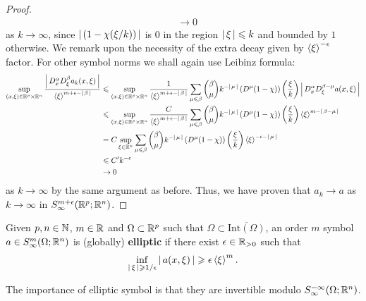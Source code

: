 \documentclass[12pt]{article}
\begin{document}
\begin{proof}
\begin{align*}
        & \to 0
    \end{align*}
    as $k \to \infty$, since $\abs{( 1- \chi(\xi/ k))}$ is 0 in the region $\abs{\xi} \leq k$ and bounded by $1$ otherwise.  We remark upon the necessity of the extra decay given by $\sym[\xi]^{-\epsilon}$ factor. For other symbol norms we shall again use Leibinz formula: 
    \begin{align*}
        \sup_{(x, \xi) \in \R^p \times \R^n} \frac{\abs{D^\alpha_x D^\beta_\xi a_k(x, \xi)}}{\sym[\xi]^{m + \epsilon - \abs{\beta}}} 
        & \leq \sup_{(x, \xi) \in \R^p \times \R^n} \frac{1}{\sym[\xi]^{m + \epsilon - \abs{\beta}}} \sum_{\mu \leq \beta} \binom{\beta}{\mu}k^{-\abs{\mu}} \brac{D^\mu (1 - \chi)}\brac{\frac{\xi}{k}} \abs{D^\alpha_x D^{\beta - \mu}_\xi a(x, \xi) } \\
        & \leq  \sup_{(x, \xi) \in \R^p \times \R^n} \frac{C}{\sym[\xi]^{m + \epsilon - \abs{\beta}}} \sum_{\mu \leq \beta} \binom{\beta}{\mu}k^{-\abs{\mu}} \brac{D^\mu (1 - \chi)}\brac{\frac{\xi}{k}} \sym[\xi]^{m - \abs{\beta - \mu}}  \\
        & = C \sup_{\xi \in \R^n} \sum_{\mu \leq \beta} \binom{\beta}{\mu}k^{-\abs{\mu}} \brac{D^\mu (1 - \chi)}\brac{\frac{\xi}{k}} \sym[\xi]^{- \epsilon - \abs{\mu}}  \\
        & \leq C' k^{- \epsilon} \\
        & \to 0
    \end{align*}
    as $k \to \infty$ by the same argument as before. Thus, we have proven that $a_k \to a$ as $k \to \infty$ in $S^{m + \epsilon}_\infty(\R^p; \R^n)$. 
    
\end{proof}



\begin{fdefinition}
    Given $p, n \in \N$, $m \in \R$ and $\Omega \subset \R^p$ such that $\Omega \subset \overline{\mathrm{Int}(\Omega)}$, an order $m$ symbol $a \in S^m_\infty(\Omega; \R^n)$ is (globally) \textbf{elliptic} if there exist $\epsilon \in \R_{>0}$ such that 
    \[
    \inf_{\abs{\xi} \geq 1/\epsilon} \abs{a(x, \xi)} \geq \epsilon \sym[\xi]^m. 
    \]
\end{fdefinition}
The importance of elliptic symbol is that they are invertible modulo $S^{-\infty}_\infty(\Omega; \R^n)$. 
\end{document}
